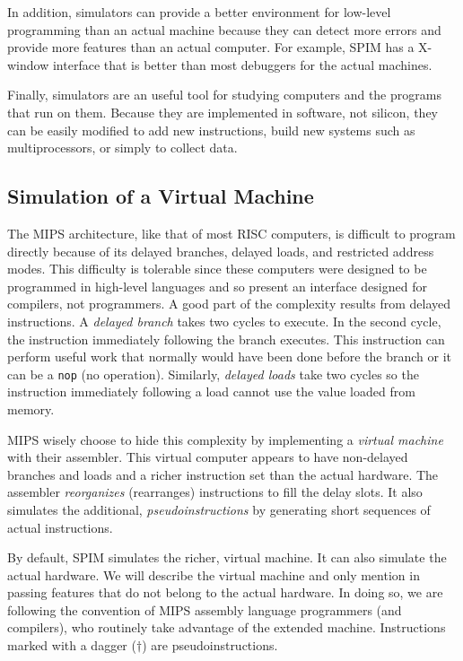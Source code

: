 In addition, simulators can provide a better environment for low-level
programming than an actual machine because they can detect more errors
and provide more features than an actual computer.  For example, SPIM
has a X-window interface that is better than most debuggers for the
actual machines.

Finally, simulators are an useful tool for studying computers and the
programs that run on them.  Because they are implemented in software,
not silicon, they can be easily modified to add new instructions,
build new systems such as multiprocessors, or simply to collect data.

\subsection{Simulation of a Virtual Machine}

The MIPS architecture, like that of most RISC computers, is difficult
to program directly because of its delayed branches, delayed loads,
and restricted address modes.  This difficulty is tolerable since
these computers were designed to be programmed in high-level languages
and so present an interface designed for compilers, not programmers.
A good part of the complexity results from delayed instructions.  A
{\em delayed branch\/} takes two cycles to execute.  In the second
cycle, the instruction immediately following the branch executes.
This instruction can perform useful work that normally would have been
done before the branch or it can be a {\tt nop} (no operation).
Similarly, {\em delayed loads\/} take two cycles so the instruction
immediately following a load cannot use the value loaded from memory.

MIPS wisely choose to hide this complexity by implementing a {\em
virtual machine\/} with their assembler.  This virtual computer
appears to have non-delayed branches and loads and a richer
instruction set than the actual hardware.  The assembler {\em
reorganizes\/} (rearranges) instructions to fill the delay slots.  It
also simulates the additional, {\em pseudoinstructions\/} by
generating short sequences of actual instructions.

By default, SPIM simulates the richer, virtual machine.  It can also
simulate the actual hardware.  We will describe the virtual machine
and only mention in passing features that do not belong to the actual
hardware.  In doing so, we are following the convention of MIPS
assembly language programmers (and compilers), who routinely take
advantage of the extended machine.  Instructions marked with a dagger
($\dagger$) are pseudoinstructions.

